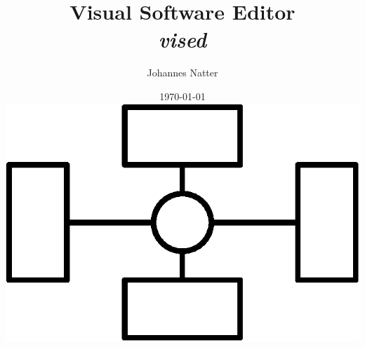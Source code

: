 \documentclass[a4paper,11pt,oneside]{book}
\newcommand{\vised}{\emph{vised}\xspace}
\begin{document}
  \title{\textbf{Visual Software Editor \\ \vised}} 
  \author{Johannes Natter}
  \date{\today \\ \vspace{5cm} \includegraphics[width=100 pt]{../_common/logo}}

  \frontmatter
  \maketitle
  
  \tableofcontents
  

  \mainmatter
  
  
  
  
  
  

  \clearpage

  \backmatter

  \printbibliography
\end{document}
